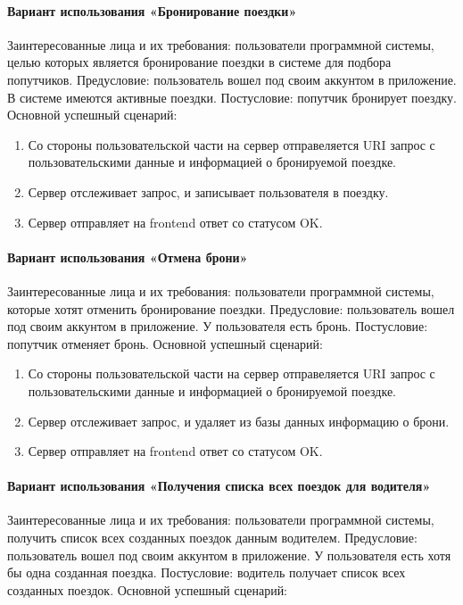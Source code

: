 \paragraph{Вариант использования «Бронирование поездки»}
Заинтересованные лица и их требования: пользователи программной системы, целью которых является бронирование поездки в системе для подбора попутчиков. Предусловие:  пользователь вошел под своим аккунтом в приложение. В системе имеются активные поездки. Постусловие: попутчик бронирует поездку.
Основной успешный сценарий:

\begin{enumerate}
	\item Со стороны пользовательской части на сервер отправеляется URI запрос с пользовательскими данные и информацией о бронируемой поездке.
	\item Сервер отслеживает запрос, и записывает пользователя в поездку.
	\item Сервер отправляет на frontend ответ со статусом OK.
\end{enumerate}

\paragraph{Вариант использования «Отмена брони»}
Заинтересованные лица и их требования: пользователи программной системы, которые хотят отменить бронирование поездки. Предусловие:  пользователь вошел под своим аккунтом в приложение. У пользователя есть бронь. Постусловие: попутчик отменяет бронь.
Основной успешный сценарий:

\begin{enumerate}
	\item Со стороны пользовательской части на сервер отправеляется URI запрос с пользовательскими данные и информацией о бронируемой поездке.
	\item Сервер отслеживает запрос, и удаляет из базы данных информацию о брони.
	\item Сервер отправляет на frontend ответ со статусом OK.
\end{enumerate}

\paragraph{Вариант использования «Получения списка всех поездок для водителя»}
Заинтересованные лица и их требования: пользователи программной системы, получить список всех созданных поездок данным водителем. Предусловие:  пользователь вошел под своим аккунтом в приложение. У пользователя есть хотя бы одна созданная поездка. Постусловие: водитель получает список всех созданных поездок.
Основной успешный сценарий:

